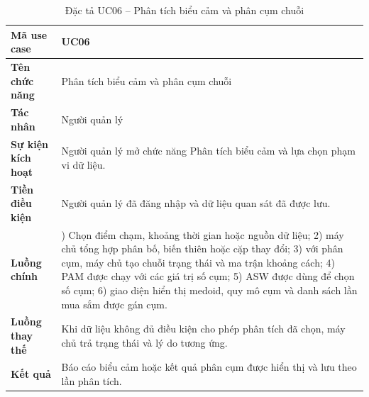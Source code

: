 \documentclass[../LuanVan.tex]{subfiles}
\begin{document}
\begin{table}[H]
    \centering
    \caption{Đặc tả UC06 -- Phân tích biểu cảm và phân cụm chuỗi}
    \label{tab:uc06_analysis_ch4}
    \begin{tabular}{|>{\raggedright\arraybackslash}p{3.0cm}|>{\raggedright\arraybackslash}p{10.9cm}|}
        \hline
        \textbf{Mã use case} & UC06 \\
        \hline
        \textbf{Tên chức năng} & Phân tích biểu cảm và phân cụm chuỗi \\
        \hline
        \textbf{Tác nhân} & Người quản lý \\
        \hline
        \textbf{Sự kiện kích hoạt} & Người quản lý mở chức năng Phân tích biểu cảm và lựa chọn phạm vi dữ liệu. \\
        \hline
        \textbf{Tiền điều kiện} & Người quản lý đã đăng nhập và dữ liệu quan sát đã được lưu. \\
        \hline
        \textbf{Luồng chính} & 1) Chọn điểm chạm, khoảng thời gian hoặc nguồn dữ liệu; 2) máy chủ tổng hợp phân bố, biến thiên hoặc cặp thay đổi; 3) với phân cụm, máy chủ tạo chuỗi trạng thái và ma trận khoảng cách; 4) PAM được chạy với các giá trị số cụm; 5) ASW được dùng để chọn số cụm; 6) giao diện hiển thị medoid, quy mô cụm và danh sách lần mua sắm được gán cụm. \\
        \hline
        \textbf{Luồng thay thế} & Khi dữ liệu không đủ điều kiện cho phép phân tích đã chọn, máy chủ trả trạng thái và lý do tương ứng. \\
        \hline
        \textbf{Kết quả} & Báo cáo biểu cảm hoặc kết quả phân cụm được hiển thị và lưu theo lần phân tích. \\
        \hline
    \end{tabular}
\end{table}
\end{document}

